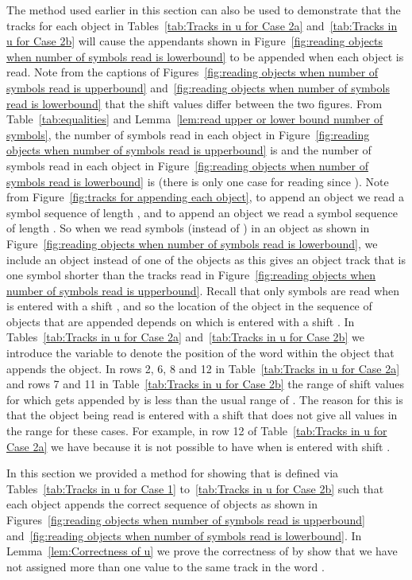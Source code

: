 \documentclass[11pt]{article} \usepackage{amsfonts,amsmath,amssymb,amsthm}
\begin{document}
The method used earlier in this section can also be used to demonstrate that the  tracks for each object in Tables~\ref{tab:Tracks in u for Case 2a} and~\ref{tab:Tracks in u for Case 2b} will cause the appendants shown in Figure~\ref{fig:reading objects when number of symbols read is lowerbound} to be appended when each object is read. 
Note from the captions of Figures~\ref{fig:reading objects when number of symbols read is upperbound} and~\ref{fig:reading objects when number of symbols read is lowerbound} that the shift values differ between the two figures. 
From Table~\ref{tab:equalities} and Lemma~\ref{lem:read upper or lower bound number of symbols}, the number of symbols read in each object in  Figure~\ref{fig:reading objects when number of symbols read is upperbound} is  and the number of symbols read in each object in  Figure~\ref{fig:reading objects when number of symbols read is lowerbound} is  (there is only one case for reading  since ). 
Note from Figure~\ref{fig:tracks for appending each object}, to append an  object we read a symbol sequence of length , and to append an  object we read a symbol sequence of length . 
So when we read  symbols (instead of ) in an object as shown in Figure~\ref{fig:reading objects when number of symbols read is lowerbound}, we include an  object instead of one of the  objects as this gives an object track that is one symbol shorter than the tracks read in Figure~\ref{fig:reading objects when number of symbols read is upperbound}. 
Recall that only  symbols are read when  is entered with a shift , and so the location of the  object in the sequence of objects that are appended depends on which  is entered with a shift . 
In Tables~\ref{tab:Tracks in u for Case 2a} and~\ref{tab:Tracks in u for Case 2b} we introduce the variable  to denote the position of the  word within the object that appends the  object. 
In rows 2, 6, 8 and 12 in Table~\ref{tab:Tracks in u for Case 2a} and rows 7 and 11 in Table~\ref{tab:Tracks in u for Case 2b} the range of shift values for which  gets appended by  is less than the usual range of . 
The reason for this is that the object being read is entered with a shift  that does not give all values in the range  for these cases. 
For example, in row 12 of Table~\ref{tab:Tracks in u for Case 2a} we have  because it is not possible to have  when  is entered with shift .

In this section we provided a method for showing that  is defined via Tables~\ref{tab:Tracks in u for Case 1} to~\ref{tab:Tracks in u for Case 2b} such that each object appends the correct sequence of objects as shown in Figures~\ref{fig:reading objects when number of symbols read is upperbound} and~\ref{fig:reading objects when number of symbols read is lowerbound}. In Lemma~\ref{lem:Correctness of u} we prove the correctness of  by show that we have not assigned more than one value to the same track in the word .
\end{document}

